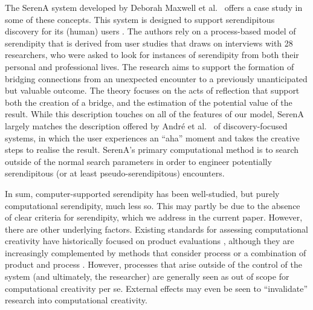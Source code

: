 The {\sf SerenA} system developed by Deborah Maxwell et
al.~\citeyear{maxwell2012designing} offers a case study in some
of these concepts.  This system is designed to support
serendipitous discovery for its (human) users
\cite{forth2013serena}.  The authors rely on a process-based
model of serendipity \cite{Makri2012,Makri2012a} that is derived
from user studies that draws on interviews with 28 researchers,
who were asked to look for instances of serendipity from both
their personal and professional lives.  The research aims to
support the formation of bridging connections from an unexpected
encounter to a previously unanticipated but valuable outcome.
The theory focuses on the acts of reflection that support both
the creation of a bridge, and the estimation of the potential
value of the result.
%
While this description touches on all of the features of our model, {\sf
  SerenA} largely matches the description offered by Andr{\'e} et
al.~\citeyear{andre2009discovery} of discovery-focused systems, in which
the user experiences an ``aha'' moment and takes the
creative steps to realise the result.  {\sf SerenA}'s primary computational method is to
search outside of the normal search parameters in order to engineer
potentially serendipitous (or at least pseudo-serendipitous)
encounters.

In sum, computer-supported serendipity has been well-studied, but
purely computational serendipity, much less so.  This may partly be
due to the absence of clear criteria for serendipity, which we address
in the current paper.  However, there are other underlying factors.
Existing standards for assessing computational creativity have
historically focused on product evaluations \cite{ritchie07}, although
they are increasingly complemented by methods that consider process
\cite{colton2008creativity,colton-assessingprogress} or a combination
of product and process \cite{jordanous:12}.  However, processes that
arise outside of the control of the system (and ultimately, the
researcher) are generally seen as out of scope for computational
creativity per se.  External effects may even be seen to
``invalidate'' research into computational creativity.
%

